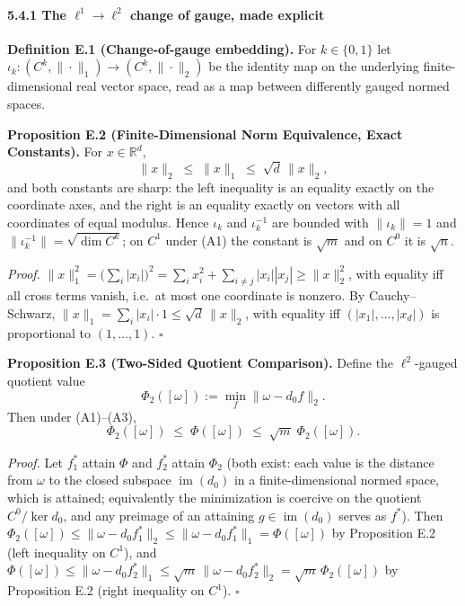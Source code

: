 \documentclass[
]{article}
\begin{document}
\paragraph{\texorpdfstring{5.4.1 The \(\ell^1 \to \ell^2\) change of gauge, made explicit}{5.4.1 The \textbackslash ell\^{}1 \textbackslash to \textbackslash ell\^{}2 change of gauge, made explicit}}\label{the-ell1-to-ell2-change-of-gauge-made-explicit}

\textbf{Definition E.1 (Change-of-gauge embedding).} For \(k \in \{0,1\}\) let \(\iota_k : (C^k, \|\cdot\|_1) \to (C^k, \|\cdot\|_2)\) be the identity map on the underlying finite-dimensional real vector space, read as a map between differently gauged normed spaces.

\textbf{Proposition E.2 (Finite-Dimensional Norm Equivalence, Exact Constants).} For \(x \in \mathbb{R}^d\),
\[\|x\|_2 \;\le\; \|x\|_1 \;\le\; \sqrt{d}\,\|x\|_2 ,\]
and both constants are sharp: the left inequality is an equality exactly on the coordinate axes, and the right is an equality exactly on vectors with all coordinates of equal modulus. Hence \(\iota_k\) and \(\iota_k^{-1}\) are bounded with \(\|\iota_k\| = 1\) and \(\|\iota_k^{-1}\| = \sqrt{\dim C^k}\); on \(C^1\) under (A1) the constant is \(\sqrt{m}\) and on \(C^0\) it is \(\sqrt{n}\).

\emph{Proof.} \(\|x\|_1^2 = \big(\sum_i |x_i|\big)^2 = \sum_i x_i^2 + \sum_{i \neq j} |x_i||x_j| \ge \|x\|_2^2\), with equality iff all cross terms vanish, i.e.~at most one coordinate is nonzero. By Cauchy--Schwarz, \(\|x\|_1 = \sum_i |x_i| \cdot 1 \le \sqrt{d}\,\|x\|_2\), with equality iff \((|x_1|, \dots, |x_d|)\) is proportional to \((1,\dots,1)\). \(\square\)

\textbf{Proposition E.3 (Two-Sided Quotient Comparison).} Define the \(\ell^2\)-gauged quotient value
\[\Phi_2([\omega]) := \min_f \|\omega - d_0 f\|_2 .\]
Then under (A1)--(A3),
\[\Phi_2([\omega]) \;\le\; \Phi([\omega]) \;\le\; \sqrt{m}\;\Phi_2([\omega]) .\]

\emph{Proof.} Let \(f_1^*\) attain \(\Phi\) and \(f_2^*\) attain \(\Phi_2\) (both exist: each value is the distance from \(\omega\) to the closed subspace \(\operatorname{im}(d_0)\) in a finite-dimensional normed space, which is attained; equivalently the minimization is coercive on the quotient \(C^0/\ker d_0\), and any preimage of an attaining \(g \in \operatorname{im}(d_0)\) serves as \(f^*\)). Then
\(\Phi_2([\omega]) \le \|\omega - d_0 f_1^*\|_2 \le \|\omega - d_0 f_1^*\|_1 = \Phi([\omega])\) by Proposition E.2 (left inequality on \(C^1\)), and
\(\Phi([\omega]) \le \|\omega - d_0 f_2^*\|_1 \le \sqrt{m}\,\|\omega - d_0 f_2^*\|_2 = \sqrt{m}\,\Phi_2([\omega])\) by Proposition E.2 (right inequality on \(C^1\)). \(\square\)
\end{document}
